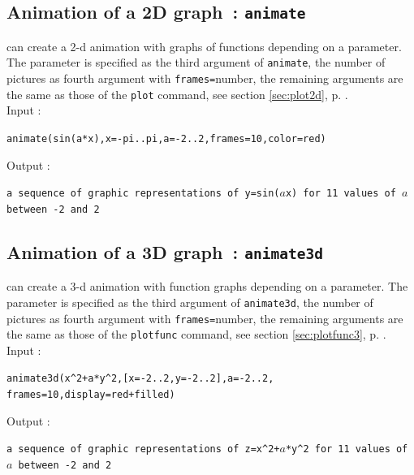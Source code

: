 \documentclass[a4paper,11pt]{book}
\begin{document}
\subsection{Animation of a 2D graph~: {\tt animate}}
 can create a 2-d animation with graphs of functions
depending on a parameter. The parameter is specified as the 
third argument of 
{\tt animate}, the number of pictures as fourth argument with
{\tt frames=}number, 
the remaining arguments are the same as those of the {\tt plot} command, 
see section \ref{sec:plot2d}, p. \pageref{sec:plot2d}.\\
Input :
\begin{center}
{\tt animate(sin(a*x),x=-pi..pi,a=-2..2,frames=10,color=red)}
\end{center}
Output :
\begin{center}{\tt a sequence of graphic representations of y=sin($a$x) for 
11 values of $a$ between -2 and 2}\end{center}

\subsection{Animation of a 3D graph~: {\tt animate3d}}
 can create a 3-d animation with 
function graphs depending on a parameter. The parameter is specified as
the third argument of {\tt animate3d}, the number of pictures
as fourth argument with 
{\tt frames=}number, the remaining arguments
are the same as those of the {\tt plotfunc} command, see
section \ref{sec:plotfunc3}, p. \pageref{sec:plotfunc3}.\\
Input :
\begin{center}
{\tt animate3d(x\verb|^|2+a*y\verb|^|2,[x=-2..2,y=-2..2],a=-2..2, frames=10,display=red+filled)}
\end{center}
Output :
\begin{center}{\tt a sequence of graphic representations
 of z=x\verb|^|2+$a$*y\verb|^|2 for 11 values of $a$ between -2 and 2}
\end{center}
\end{document}
